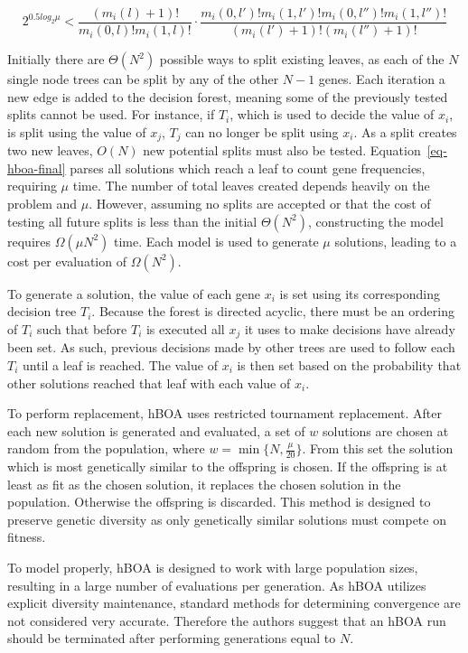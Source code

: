 \documentclass[twoside]{article}
\begin{document}
\begin{equation}
  2^{0.5 log_2\mu} < \frac{(m_i(l) + 1)!}{m_i(0, l)!m_i(1,l)!} \cdot
  \frac{m_i(0, l')!m_i(1,l')!m_i(0, l'')!m_i(1,l'')!}{(m_i(l') + 1)!(m_i(l'') + 1)!}
  \label{eq-hboa-final}
\end{equation}

Initially there are $\Theta(N^2)$ possible ways to split existing leaves, as each of the $N$ single node
trees can be split by any of the other $N-1$ genes. Each iteration a new edge is added to the decision
forest, meaning some of the previously tested splits cannot be used. For instance, if $T_i$, which is used
to decide the value of $x_i$, is split using the value of $x_j$, $T_j$ can no longer be split using $x_i$.
As a split creates two new leaves, $O(N)$ new potential splits must also be tested. Equation~\ref{eq-hboa-final}
parses all solutions which reach a leaf to count gene frequencies, requiring $\mu$ time.
The number of total leaves created depends heavily on the problem and $\mu$.
However, assuming no splits are accepted or that the cost of testing all future splits is less than
the initial $\Theta(N^2)$, constructing the model requires $\Omega(\mu N^2)$ time. Each
model is used to generate $\mu$ solutions, leading to a cost per evaluation of $\Omega(N^2)$.

To generate a solution, the value of each gene $x_i$ is set using its corresponding decision tree $T_i$. Because
the forest is directed acyclic, there must be an ordering of $T_i$ such that before $T_i$ is executed all
$x_j$ it uses to make decisions have already been set. As such, previous decisions made by other trees
are used to follow each $T_i$ until a leaf is reached. The value of $x_i$ is then set based on the
probability that other solutions reached that leaf with each value of $x_i$.

To perform replacement, hBOA uses restricted tournament replacement. After each new solution is generated
and evaluated, a set of $w$ solutions are chosen at random from the population, where $w=\min\{N, \frac{\mu}{20}\}$.
From this set the solution which is most genetically similar to the offspring is chosen. If the offspring
is at least as fit as the chosen solution, it replaces the chosen solution in the population. Otherwise the
offspring is discarded. This method is designed to preserve genetic diversity as only genetically similar
solutions must compete on fitness.

To model properly, hBOA is designed to work with large population sizes, resulting in a large number of
evaluations per generation. As hBOA utilizes explicit diversity maintenance, standard methods for determining
convergence are not considered very accurate. Therefore the authors suggest that an hBOA run should be
terminated after performing generations equal to $N$.
\end{document}
